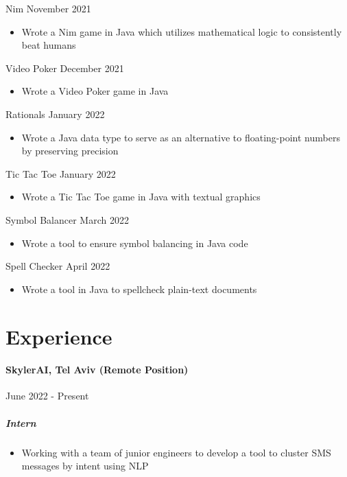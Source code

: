 \documentclass[10pt]{article}
\begin{document}
    Nim \hfill November 2021
    \begin{itemize}
        \item Wrote a Nim game in Java which utilizes mathematical logic to consistently beat humans
    \end{itemize}

    Video Poker \hfill December 2021
    \begin{itemize}
        \item Wrote a Video Poker game in Java
    \end{itemize}

    Rationals \hfill January 2022
    \begin{itemize}
        \item Wrote a Java data type to serve as an alternative to floating-point numbers by preserving precision
    \end{itemize}

    Tic Tac Toe \hfill January 2022
    \begin{itemize}
        \item Wrote a Tic Tac Toe game in Java with textual graphics
    \end{itemize}

    Symbol Balancer \hfill March 2022
    \begin{itemize}
        \item Wrote a tool to ensure symbol balancing in Java code
    \end{itemize}

    Spell Checker \hfill April 2022
    \begin{itemize}
        \item Wrote a tool in Java to spellcheck plain-text documents
    \end{itemize}


\section*{Experience}   

    \paragraph{SkylerAI, Tel Aviv (Remote Position)} \hfill June 2022 - Present
    \subparagraph*{Intern}
    \begin{itemize}
        \item Working with a team of junior engineers to develop a tool to cluster SMS messages by intent using NLP
    \end{itemize}
\end{document}
